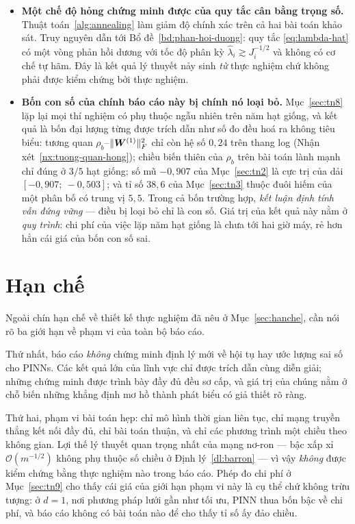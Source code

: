 \begin{itemize}[leftmargin=*]
\item \textbf{Một chế độ hỏng chứng minh được của quy tắc cân bằng trọng số.}
      Thuật toán~\ref{alg:annealing} làm giảm độ chính xác trên cả hai bài toán
      khảo sát. Truy nguyên dẫn tới Bổ đề~\ref{bd:phan-hoi-duong}: quy tắc
      \eqref{eq:lambda-hat} có một vòng phản hồi dương với tốc độ phân kỳ
      $\hat\lambda_i \gtrsim J_i^{-1/2}$ và không có cơ chế tự hãm. Đây là kết
      quả lý thuyết nảy sinh \emph{từ} thực nghiệm chứ không phải được kiểm chứng
      bởi thực nghiệm.
\item \textbf{Bốn con số của chính báo cáo này bị chính nó loại bỏ.}
      Mục~\ref{sec:tn8} lặp lại mọi thí nghiệm có phụ thuộc ngẫu nhiên trên năm
      hạt giống, và kết quả là bốn đại lượng từng được trích dẫn như số đo đều
      hoá ra không tiêu biểu: tương quan $\rho_b$--$\lVert\bm{W}^{(1)}\rVert_F^2$ chỉ còn
      hệ số $0{,}24$ trên thang log (Nhận xét~\ref{nx:tuong-quan-hong}); chiều
      biến thiên của $\rho_b$ trên bài toán lành mạnh chỉ đúng ở $3/5$ hạt giống;
      số mũ $-0{,}907$ của Mục~\ref{sec:tn2} là cực trị của dải
      $[-0{,}907;\ -0{,}503]$; và tỉ số $38{,}6$ của Mục~\ref{sec:tn3} thuộc đuôi
      hiếm của một phân bố có trung vị $5{,}5$. Trong cả bốn trường hợp,
      \emph{kết luận định tính vẫn đứng vững} --- điều bị loại bỏ chỉ là con số.
      Giá trị của kết quả này nằm ở \emph{quy trình}: chi phí của việc lặp năm
      hạt giống là chưa tới hai giờ máy, rẻ hơn hẳn cái giá của bốn con số sai.
\end{itemize}

\section{Hạn chế}
\label{sec:han-che-cuoi}

Ngoài chín hạn chế về thiết kế thực nghiệm đã nêu ở Mục~\ref{sec:hanche}, cần nói
rõ ba giới hạn về phạm vi của toàn bộ báo cáo.

Thứ nhất, báo cáo \emph{không} chứng minh định lý mới về hội tụ hay ước lượng
sai số cho PINNs. Các kết quả lớn của lĩnh vực chỉ được trích dẫn cùng diễn giải;
những chứng minh được trình bày đầy đủ đều sơ cấp, và giá trị của chúng nằm ở chỗ
biến những khẳng định mơ hồ thành phát biểu có giả thiết rõ ràng.

Thứ hai, phạm vi bài toán hẹp: chỉ mô hình thời gian liên tục, chỉ mạng truyền
thẳng kết nối đầy đủ, chỉ bài toán thuận, và chỉ các phương trình một chiều theo
không gian. Lợi thế lý thuyết quan trọng nhất của mạng nơ-ron --- bậc xấp xỉ
$\mathcal{O}(m^{-1/2})$ không phụ thuộc số chiều ở Định lý~\ref{dl:barron} ---
vì vậy \emph{không} được kiểm chứng bằng thực nghiệm nào trong báo cáo. Phép đo
chi phí ở Mục~\ref{sec:tn9} cho thấy cái giá của giới hạn phạm vi này là cụ thể
chứ không trừu tượng: ở $d = 1$, nơi phương pháp lưới gần như tối ưu, PINN thua
bốn bậc về chi phí, và báo cáo không có bài toán nào để cho thấy tỉ số ấy đảo
chiều.

